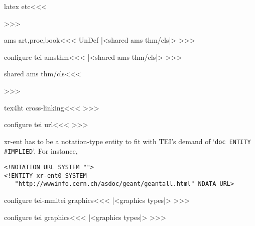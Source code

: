 {\<latex etc\><<<
   {\IgnorePar\EndP{}}
   {\IgnorePar\EndP{}\ShowPar}
   {}{}
   {\IgnorePar\EndP{}}
   {\ShowPar\par}
   {\IgnorePar\EndP{}\ShowPar\par}
>>>




\<ams art,proc,book\><<<
\ifx {}\:UnDef\else   
   |<shared ams thm/cls|>
\fi
>>>

\<configure tei amsthm\><<<
|<shared ams thm/cls|>
>>>

\<shared ams thm/cls\><<<
   {\IgnorePar\EndP{}}
   {\ShowPar\par}
   {\IgnorePar\EndP{}\ShowPar\par}
>>>




\<tex4ht cross-linking\><<<
>>>

\<configure tei url\><<<
\LinkCommand{}
>>>

 xr-ent has to be a notation-type entity to fit with TEI's demand
 of `\verb+doc ENTITY #IMPLIED+'. For instance,

\begin{verbatim}
<!NOTATION URL SYSTEM "">
<!ENTITY xr-ent0 SYSTEM
   "http://wwwinfo.cern.ch/asdoc/geant/geantall.html" NDATA URL>
\end{verbatim}



\<configure tei-mmltei graphics\><<<
\def\:tempc#1{%
   \Configure{graphics*}
      {#1}
      {\HCode{<figure entity="fg-ent\ent:cnt" 
                  width="\the\Gin@req@width" 
                 height="\the\Gin@req@height" />}%
       \Decl{<!ENTITY fg-ent\ent:cnt\space  SYSTEM 
             "\csname Gin@base\endcsname" NDATA #1>}%
       \gHAdvance\ent:cnt by 1
      }}
|<graphics types|>
>>>


\<configure tei graphics\><<<
\def\:tempc#1{%
   \Decl{<!NOTATION #1 SYSTEM "" >}
   \Configure{graphics*}
      {#1}
      {\HCode{<figure entity="fg-ent\ent:cnt" />%
              <!--width="\the\Gin@req@width" 
                 height="\the\Gin@req@height"-->}%
       \Decl{<!ENTITY fg-ent\ent:cnt\space  SYSTEM 
             "\csname Gin@base\endcsname.#1" NDATA #1>}%
       \gHAdvance\ent:cnt by 1
      }}
|<graphics types|>
>>>

}
